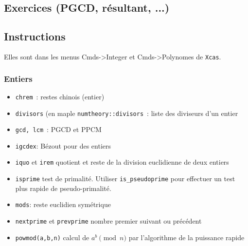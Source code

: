 \documentclass[a4paper,11pt]{article}
\begin{document}
\begin{giacjshere}
\pagebreak

\section{Exercices (PGCD, r\'esultant, ...)}

\subsection{Instructions}
Elles sont dans les menus
Cmds->Integer et Cmds->Polynomes de \verb|Xcas|.

\subsubsection{Entiers}
\begin{itemize}
\item \verb|chrem|~:
restes chinois (entier)
\item \verb|divisors|
(en maple \verb|numtheory::divisors|~:
liste des diviseurs d'un entier
\item \verb|gcd, lcm|~: PGCD et PPCM
\item \verb|igcdex|: Bézout pour des entiers
\item \verb|iquo| et \verb|irem| quotient et reste de la division 
euclidienne de deux entiers
\item \verb|isprime| test de primalit\'e. 
Utiliser \verb|is_pseudoprime| pour effectuer un test plus rapide
de pseudo-primalit\'e.
\item \verb|mods|: reste euclidien symétrique
\item \verb|nextprime| et \verb|prevprime| 
nombre premier suivant ou pr\'ec\'edent
\item \verb|powmod(a,b,n)| %
calcul de $a^b \pmod n$ par
l'algorithme de la puissance rapide
\end{itemize}


\end{giacjshere}
\end{document}
